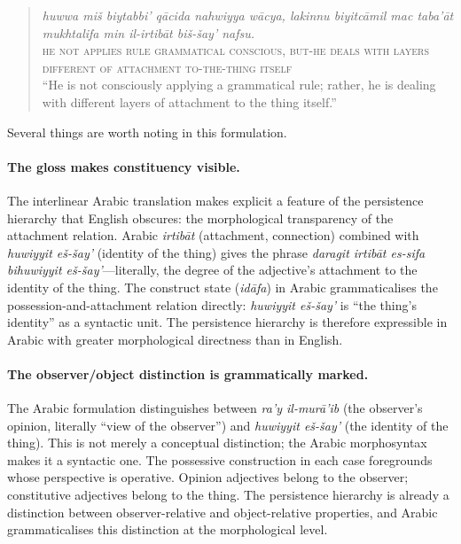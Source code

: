 \documentclass[11pt]{article}
\theoremstyle{rthm}
\theoremstyle{rdef}
\theoremstyle{remark}
\begin{document}
\begin{quote}
\textit{huwwa mi\v{s} biytabbi' q\={a}cida nahwiyya w\={a}cya, lakinnu biyitc\={a}mil mac
taba'\={a}t mukhtalifa min il-irtib\={a}t bi\v{s}-\v{s}ay' nafsu.}\\
\smallskip
\textsc{he not applies rule grammatical conscious, but-he deals with layers
different of attachment to-the-thing itself}\\
\smallskip
``He is not consciously applying a grammatical rule; rather, he is dealing
with different layers of attachment to the thing itself.''
\end{quote}
\medskip

Several things are worth noting in this formulation.

\paragraph{The gloss makes constituency visible.}
The interlinear Arabic translation makes explicit a feature of the persistence
hierarchy that English obscures: the morphological transparency of the
attachment relation. Arabic \textit{irtib\={a}t} (attachment, connection) combined
with \textit{huwiyyit e\v{s}-\v{s}ay'} (identity of the thing) gives the phrase
\textit{daragit irtib\={a}t es-sifa bihuwiyyit e\v{s}-\v{s}ay'}---literally, the degree
of the adjective's attachment to the identity of the thing. The construct state
(\textit{id\={a}fa}) in Arabic grammaticalises the possession-and-attachment
relation directly: \textit{huwiyyit e\v{s}-\v{s}ay'} is ``the thing's identity'' as a
syntactic unit. The persistence hierarchy is therefore expressible in Arabic
with greater morphological directness than in English.

\paragraph{The observer/object distinction is grammatically marked.}
The Arabic formulation distinguishes between \textit{ra'y il-mur\={a}'ib}
(the observer's opinion, literally ``view of the observer'') and
\textit{huwiyyit e\v{s}-\v{s}ay'} (the identity of the thing). This is not merely a
conceptual distinction; the Arabic morphosyntax makes it a syntactic one.
The possessive construction in each case foregrounds whose perspective is
operative. Opinion adjectives belong to the observer; constitutive adjectives
belong to the thing. The persistence hierarchy is already a distinction between
observer-relative and object-relative properties, and Arabic grammaticalises
this distinction at the morphological level.
\end{document}
